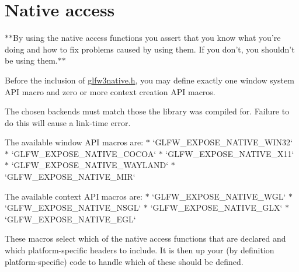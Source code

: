 \hypertarget{group__native}{
\section{Native access}
\label{group__native}
}
$\ast$$\ast$By using the native access functions you assert that you know what you're doing and how to fix problems caused by using them. If you don't, you shouldn't be using them.$\ast$$\ast$

Before the inclusion of \hyperlink{glfw3native_8h}{glfw3native.h}, you may define exactly one window system API macro and zero or more context creation API macros.

The chosen backends must match those the library was compiled for. Failure to do this will cause a link-time error.

The available window API macros are: $\ast$ `GLFW\_\-EXPOSE\_\-NATIVE\_\-WIN32` $\ast$ `GLFW\_\-EXPOSE\_\-NATIVE\_\-COCOA` $\ast$ `GLFW\_\-EXPOSE\_\-NATIVE\_\-X11` $\ast$ `GLFW\_\-EXPOSE\_\-NATIVE\_\-WAYLAND` $\ast$ `GLFW\_\-EXPOSE\_\-NATIVE\_\-MIR`

The available context API macros are: $\ast$ `GLFW\_\-EXPOSE\_\-NATIVE\_\-WGL` $\ast$ `GLFW\_\-EXPOSE\_\-NATIVE\_\-NSGL` $\ast$ `GLFW\_\-EXPOSE\_\-NATIVE\_\-GLX` $\ast$ `GLFW\_\-EXPOSE\_\-NATIVE\_\-EGL`

These macros select which of the native access functions that are declared and which platform-specific headers to include. It is then up your (by definition platform-specific) code to handle which of these should be defined. 